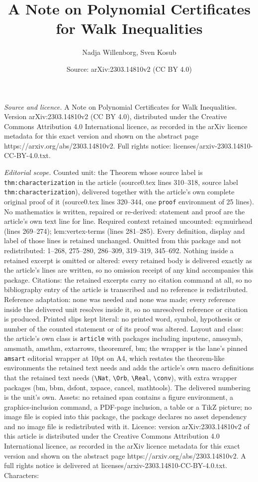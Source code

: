 \documentclass[10pt,a4paper]{amsart}
\title[A Note on Polynomial Certificates for Walk Inequalities]{A Note on Polynomial Certificates for Walk Inequalities}
\author{Nadja Willenborg, Sven Kosub}
\date{Source: arXiv:2303.14810v2 (CC BY 4.0)}
\begin{document}
\maketitle

\noindent\emph{Source and licence.} A Note on Polynomial Certificates for Walk Inequalities. Version arXiv:2303.14810v2 (CC BY 4.0), distributed under the Creative Commons Attribution 4.0 International licence, as recorded in the arXiv licence metadata for this exact version and shown on the abstract page https://arxiv.org/abs/2303.14810v2. Full rights notice: licenses/arxiv-2303.14810-CC-BY-4.0.txt.\par\smallskip

\noindent\textit{Editorial scope.} Counted unit: the Theorem whose source label is \texttt{thm:characterization} in the article (source0.tex lines 310--318, source label \texttt{thm:characterization}), delivered together with the article's own complete original proof of it (source0.tex lines 320--344, one \texttt{proof} environment of 25 lines). No mathematics is written, repaired or re-derived: statement and proof are the article's own text line for line. Required context retained uncounted: eq:muirhead (lines 269--274); lem:vertex-terms (lines 281--285). Every definition, display and label of those lines is retained unchanged. Omitted from this package and not redistributed: 1--268, 275--280, 286--309, 319--319, 345--692. Nothing inside a retained excerpt is omitted or altered: every retained body is delivered exactly as the article's lines are written, so no omission receipt of any kind accompanies this package. Citations: the retained excerpts carry no citation command at all, so no bibliography entry of the article is transcribed and no reference is redistributed. Reference adaptation: none was needed and none was made; every reference inside the delivered unit resolves inside it, so no unresolved reference or citation is produced. Printed slips kept literal: no printed word, symbol, hypothesis or number of the counted statement or of its proof was altered. Layout and class: the article's own class is \texttt{article} with packages including inputenc, amssymb, amsmath, amsthm, extarrows, theoremref, bm; the wrapper is the lane's pinned \texttt{amsart} editorial wrapper at 10pt on A4, which restates the theorem-like environments the retained text needs and adds the article's own macro definitions that the retained text needs (\texttt{\textbackslash Nat}, \texttt{\textbackslash Orb}, \texttt{\textbackslash Real}, \texttt{\textbackslash conv}), with extra wrapper packages (bm, bbm, dsfont, xspace, cancel, mathtools). The delivered numbering is the unit's own. Assets: no retained span contains a figure environment, a graphics-inclusion command, a PDF-page inclusion, a table or a TikZ picture; no image file is copied into this package, the package declares no asset dependency and no image file is redistributed with it. Licence: version arXiv:2303.14810v2 of this article is distributed under the Creative Commons Attribution 4.0 International licence, as recorded in the arXiv licence metadata for this exact version and shown on the abstract page https://arxiv.org/abs/2303.14810v2. A full rights notice is delivered at licenses/arxiv-2303.14810-CC-BY-4.0.txt. Characters: 
\end{document}
